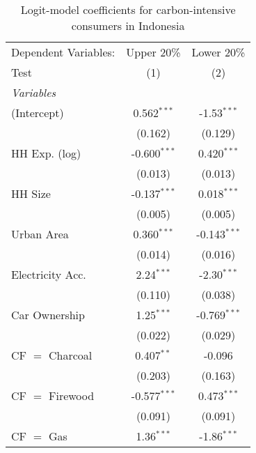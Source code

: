 
\begin{table}[htbp!]
   \centering
   \small
   \begin{adjustbox}{width = 1\textwidth, max height = 0.95\textheight, center}
      \begin{threeparttable}[b]
         \caption{\label{tab:Logit_1_IDN} Logit-model coefficients for carbon-intensive consumers in Indonesia}
         \begin{tabular}{lcc}
            \tabularnewline \midrule \midrule
            Dependent Variables: & Upper 20\%     & Lower 20\%\\   
            Test                 & (1)            & (2)\\  
            \midrule
            \emph{Variables}\\
            (Intercept)          & 0.562$^{***}$  & -1.53$^{***}$\\   
                                 & (0.162)        & (0.129)\\   
            HH Exp. (log)        & -0.600$^{***}$ & 0.420$^{***}$\\   
                                 & (0.013)        & (0.013)\\   
            HH Size              & -0.137$^{***}$ & 0.018$^{***}$\\   
                                 & (0.005)        & (0.005)\\   
            Urban Area           & 0.360$^{***}$  & -0.143$^{***}$\\   
                                 & (0.014)        & (0.016)\\   
            Electricity Acc.     & 2.24$^{***}$   & -2.30$^{***}$\\   
                                 & (0.110)        & (0.038)\\   
            Car Ownership        & 1.25$^{***}$   & -0.769$^{***}$\\   
                                 & (0.022)        & (0.029)\\   
            CF $=$ Charcoal      & 0.407$^{**}$   & -0.096\\   
                                 & (0.203)        & (0.163)\\   
            CF $=$ Firewood      & -0.577$^{***}$ & 0.473$^{***}$\\   
                                 & (0.091)        & (0.091)\\   
            CF $=$ Gas           & 1.36$^{***}$   & -1.86$^{***}$\\   

\end{tabular}
\end{threeparttable}
\end{adjustbox}
\end{table}
